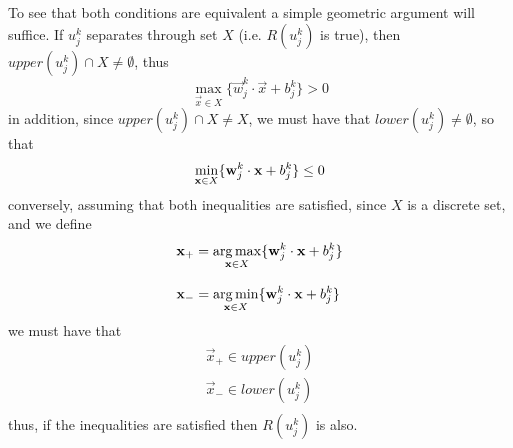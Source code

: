To see that both conditions are equivalent a simple geometric argument will suffice. If $u_j^k$ separates through set $X$ (i.e. $R(u_j^k)$ is true), then $upper(u_j^k)\cap X\neq\emptyset$, thus 
\begin{equation}
    \max_{\vec{x}\in X}\{\vec{w}_j^k\cdot\vec{x}+b_j^k\} > 0
\end{equation}
in addition, since $upper(u_j^k)\cap X\neq X$, we must have that $lower(u_j^k)\neq \emptyset$, so that 
\begin{equation}
 \displaystyle\min_{\vec{x}\in X}\{\vec{w}_j^k\cdot\vec{x}+b_j^k\} \leq 0\\     
\end{equation}
conversely, assuming that both inequalities are satisfied, since $X$ is a discrete set, and we define 
\begin{equation}
\begin{array}{l}
    \vec{x}_{+} = \displaystyle\argmax_{\vec{x}\in X}\{\vec{w}_j^k\cdot\vec{x}+b_j^k\}\\\\
    \vec{x}_{-} = \displaystyle\argmin_{\vec{x}\in X}\{\vec{w}_j^k\cdot\vec{x}+b_j^k\}\\
\end{array}
\end{equation}
we must have that 
\begin{equation}
\begin{array}{l}
 \vec{x}_{+}\in upper(u_j^k)\\
 \vec{x}_{-}\in lower(u_j^k)\\
 \end{array}
\end{equation} 
thus, if the inequalities are satisfied then $R(u_j^k)$ is also. 

